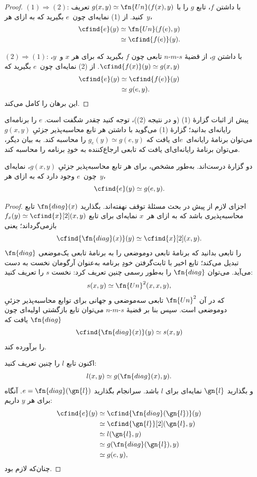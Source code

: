 \documentclass[../../../include/open-logic-section]{subfiles}
\begin{document}
\begin{proof}
$(1) \Rightarrow (2)$: با داشتن $f$، تابع $g$ را با
$g(x,y)\simeq\fn{Un}(f(x),y)$ تعریف کنید. از (1) نمایه‌ای چون~$e$
بگیرید که به ازای هر~$y$،
\begin{align*}
\cfind{e}(y) & \simeq \fn{Un}(f(e),y) \\
& \simeq \cfind{f(e)}(y).
\end{align*}

$(2) \Rightarrow (1)$: با داشتن $g$، از قضیهٔ $s$-$m$-$n$ تابعی
چون $f$ بگیرید که برای هر $x$ و~$y$،
$\cfind{f(x)}(y)\simeq g(x,y)$. از (2) نمایه‌ای چون~$e$ بگیرید که
\begin{align*}
\cfind{e}(y) & \simeq \cfind{f(e)}(y) \\
& \simeq g(e,y).
\end{align*}
این برهان را کامل می‌کند.
\end{proof}

\begin{explain}
پیش از اثبات گزارهٔ (1) (و در نتیجه (2))، توجه کنید چقدر شگفت است.
$e$ را برنامه‌ای رایانه‌ای بدانید؛ گزارهٔ (1) می‌گوید با داشتن هر
تابع محاسبه‌پذیر جزئیِ $g(x,y)$ می‌توان برنامهٔ رایانه‌ای~$e$ای یافت
که $g_e(y)\simeq g(e,y)$ را محاسبه کند. به بیان دیگر، می‌توان برنامهٔ
رایانه‌ای‌ای یافت که تابعی ارجاع‌کننده به خودِ برنامه را محاسبه کند.
\end{explain}

\begin{thm}
دو گزارهٔ  درست‌اند. به‌طور مشخص، برای هر تابع
محاسبه‌پذیر جزئیِ $g(x,y)$، نمایه‌ای چون~$e$ وجود دارد که به ازای
هر~$y$،
\[
\cfind{e}(y) \simeq g(e,y).
\]
\end{thm}

\begin{proof}
اجزای لازم از پیش در بحث مسئلهٔ توقف نهفته‌اند. بگذارید
$\fn{diag}(x)$ تابع محاسبه‌پذیری باشد که به ازای هر~$x$ نمایه‌ای برای
تابع $f_x(y)\simeq\cfind{x}[2](x,y)$ بازمی‌گرداند؛ یعنی
\[
\cfind{\fn{diag}(x)}(y) \simeq \cfind{x}[2](x,y).
\]
$\fn{diag}$ را تابعی بدانید که برنامهٔ تابعی دوموضعی را به برنامهٔ
تابعی یک‌موضعی تبدیل می‌کند؛ تابع اخیر با ثابت‌گرفتن خودِ برنامه به‌عنوان
آرگومان نخست به دست می‌آید. می‌توان $\fn{diag}$ را به‌طور رسمی چنین
تعریف کرد: نخست $s$ را تعریف کنید:
\[
s(x,y) \simeq \fn{Un}^2(x,x,y),
\]
که در آن $\fn{Un}^2$ تابعی سه‌موضعی و جهانی برای توابع محاسبه‌پذیر
جزئیِ دوموضعی است. سپس بنا بر قضیهٔ $s$-$m$-$n$ می‌توان تابع بازگشتی
اولیه‌ای چون $\fn{diag}$ یافت که
\[
\cfind{\fn{diag}(x)}(y) \simeq s(x,y)
\]
را برآورده کند.

اکنون تابع $l$ را چنین تعریف کنید:
\[
l(x,y) \simeq g(\fn{diag}(x),y).
\]
و بگذارید $\gn{l}$ نمایه‌ای برای $l$ باشد. سرانجام بگذارید
$e=\fn{diag}(\gn{l})$. آنگاه برای هر $y$ داریم:
\begin{align*}
\cfind{e}(y) & \simeq \cfind{\fn{diag}(\gn{l})}(y) \\
& \simeq \cfind{\gn{l}}[2](\gn{l}, y) \\
& \simeq l(\gn{l}, y) \\
& \simeq g(\fn{diag}(\gn{l}),y) \\
& \simeq g(e, y),
\end{align*}
چنان‌که لازم بود.
\end{proof}
\end{document}

